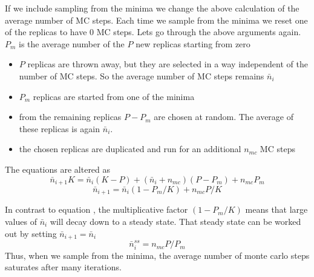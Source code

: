 \documentclass[a4paper]{article}
\begin{document}
If we include sampling from the minima we change the above calculation of the
average number of MC steps.  Each time we sample from the minima we reset
one of the replicas to have 0 MC steps.  Lets go through the above
arguments again. $P_{m}$ is the average number of the $P$ new replicas starting
from zero

\begin{itemize}
  \item $P$ replicas are thrown away, but they are selected in a way independent of the
    number of MC steps.  So the average number of MC steps remains $\bar{n}_i$

  \item $P_m$ replicas are started from one of the minima
    
  \item from the remaining replicas $P - P_m$ are chosen at random.  The average of these
    replicas is again $\bar{n}_i$.  

  \item the chosen replicas are duplicated and run for an additional $n_{mc}$ MC steps
\end{itemize}
The equations are altered as
\begin{equation}
  \bar{n}_{i+1} K = \bar{n}_i  (K - P) + (\bar{n}_i + n_{mc}) (P - P_m) + n_{mc} P_m
\end{equation}
\begin{equation}
  \bar{n}_{i+1} = \bar{n}_i (1-P_m/K)  +  n_{mc} P / K
\end{equation}

In contrast to equation \label{eqn:par_iter}, the multiplicative factor $(1-P_m/K)$
means that large values of  $\bar{n}_i$ will decay down to a steady state.  That 
steady state can be worked out by setting $\bar{n}_{i+1} = \bar{n}_i$
\begin{equation}
  \bar{n}_{i}^{ss} = n_{mc} P / P_m
\end{equation}
Thus, when we sample from the minima, the average number of monte carlo steps saturates
after many iterations.


\end{document}
